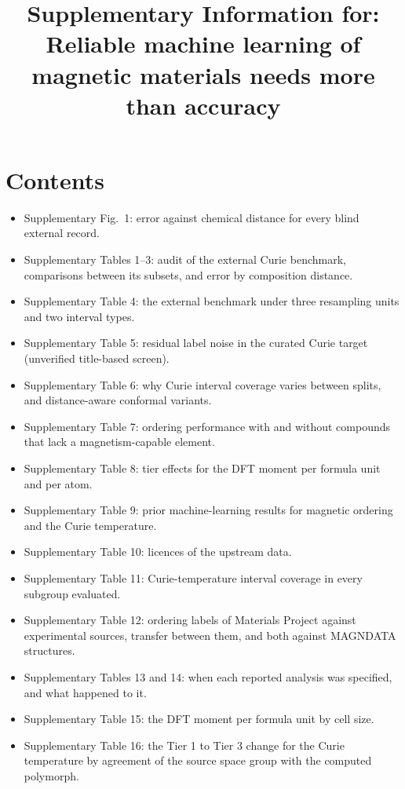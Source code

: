 \documentclass[pdflatex,sn-nature]{sn-jnl}
\begin{document}
\title[Supplementary Information]{Supplementary Information for: Reliable machine learning of magnetic materials needs more than accuracy}

\maketitle

\section{Contents}

\begin{itemize}
\item Supplementary Fig.~1: error against chemical distance for every blind external record.
\item Supplementary Tables 1--3: audit of the external Curie benchmark, comparisons between its subsets, and error by composition distance.
\item Supplementary Table 4: the external benchmark under three resampling units and two interval types.
\item Supplementary Table 5: residual label noise in the curated Curie target (unverified title-based screen).
\item Supplementary Table 6: why Curie interval coverage varies between splits, and distance-aware conformal variants.
\item Supplementary Table 7: ordering performance with and without compounds that lack a magnetism-capable element.
\item Supplementary Table 8: tier effects for the DFT moment per formula unit and per atom.
\item Supplementary Table 9: prior machine-learning results for magnetic ordering and the Curie temperature.
\item Supplementary Table 10: licences of the upstream data.
\item Supplementary Table 11: Curie-temperature interval coverage in every subgroup evaluated.
\item Supplementary Table 12: ordering labels of Materials Project against experimental sources, transfer between them, and both against MAGNDATA structures.
\item Supplementary Tables 13 and 14: when each reported analysis was specified, and what happened to it.
\item Supplementary Table 15: the DFT moment per formula unit by cell size.
\item Supplementary Table 16: the Tier 1 to Tier 3 change for the Curie temperature by agreement of the source space group with the computed polymorph.

\end{itemize}
\end{document}

